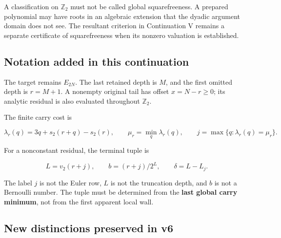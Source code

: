 \documentclass[11pt,letterpaper]{article}
\begin{document}
A classification on \(\mathbb Z_2\) must not be called global squarefreeness. A prepared polynomial may have roots in an algebraic extension that the dyadic argument domain does not see. The resultant criterion in Continuation V remains a separate certificate of squarefreeness when its nonzero valuation is established.

\subsection{Notation added in this continuation}\label{notation-added-in-this-continuation}

The target remains \(E_{2N}\). The last retained depth is \(M\), and the first omitted depth is \(r=M+1\). A nonempty original tail has offset \(x=N-r\ge0\); its analytic residual is also evaluated throughout \(\mathbb Z_2\).

The finite carry cost is

\[
\lambda_r(q)=3q+s_2(r+q)-s_2(r),\qquad
\mu_r=\min_q\lambda_r(q),\qquad
j=\max\{q:\lambda_r(q)=\mu_r\}.
\]

For a nonconstant residual, the terminal tuple is

\[
L=v_2(r+j),\qquad b=(r+j)/2^L,\qquad \delta=L-L_j.
\]

The label \(j\) is not the Euler row, \(L\) is not the truncation depth, and \(b\) is not a Bernoulli number. The tuple must be determined from the \textbf{last global carry minimum}, not from the first apparent local wall.

\subsection{New distinctions preserved in v6}\label{new-distinctions-preserved-in-v6}
\end{document}
